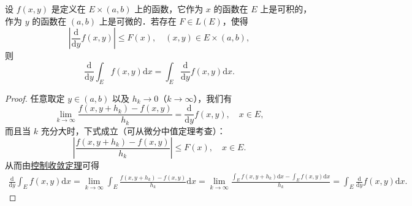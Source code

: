 \documentclass[../../main.tex]{subfiles}%
\begin{document}
\begin{theorem}[积分求导定理]\label{theorem:积分求导定理}
设 \( f(x,y) \) 是定义在 \( E \times (a,b) \) 上的函数，它作为 \( x \) 的函数在 \( E \) 上是可积的，作为 \( y \) 的函数在 \( (a,b) \) 上是可微的．若存在 \( F \in L(E) \)，使得
\[
\left| \frac{\mathrm{d}}{\mathrm{d}y} f(x,y) \right| \leqslant F(x), \quad (x,y) \in E \times (a,b),
\]
则
\[
\frac{\mathrm{d}}{\mathrm{d}y} \int_E f(x,y) \mathrm{d}x = \int_E \frac{\mathrm{d}}{\mathrm{d}y} f(x,y) \mathrm{d}x. 
\]
\end{theorem}
\begin{proof}

任意取定 \( y \in (a,b) \) 以及 \( h_k \to 0 \)（\( k \to \infty \)），我们有
\[
\lim_{k \to \infty} \frac{f(x,y + h_k) - f(x,y)}{h_k} = \frac{\mathrm{d}}{\mathrm{d}y} f(x,y), \quad x \in E,
\]
而且当 \( k \) 充分大时，下式成立（可从微分中值定理考查）：
\[
\left| \frac{f(x,y + h_k) - f(x,y)}{h_k} \right| \leqslant F(x), \quad x \in E.
\]
从而由\hyperref[theorem:控制收敛定理]{控制收敛定理}可得
\begin{align*}
\frac{\mathrm{d}}{\mathrm{d}y}\int_E{f(x,y)\mathrm{d}x}=\lim_{k\rightarrow \infty} \int_E{\frac{f(x,y+h_k)-f(x,y)}{h_k}\mathrm{d}x}=\lim_{k\rightarrow \infty} \frac{\int_E{f\left( x,y+h_k \right) \mathrm{d}x}-\int_E{f\left( x,y \right) \mathrm{d}x}}{h_k}=\int_E{\frac{\mathrm{d}}{\mathrm{d}y}f(x,y)\mathrm{d}x}.
\end{align*}

\end{proof}
\end{document}
